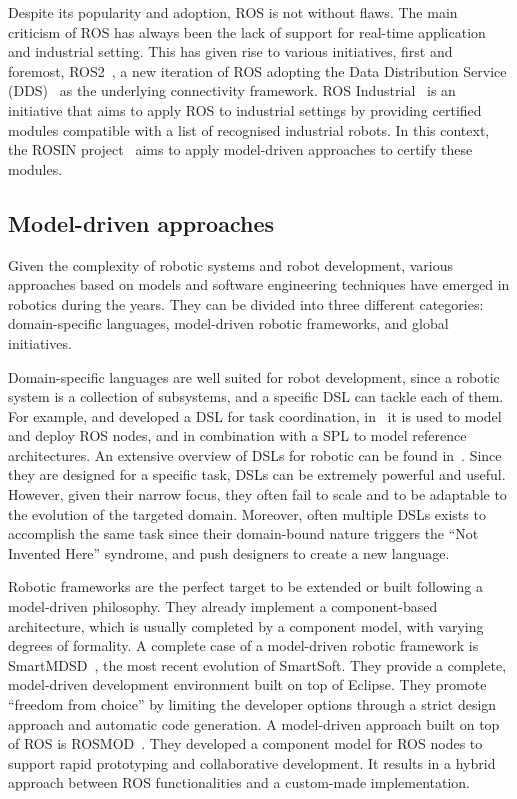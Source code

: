 Despite its popularity and adoption, ROS is not without flaws. The main criticism of ROS has always been the lack of support for real-time application and industrial setting. This has given rise to various initiatives, first and foremost, ROS2~\cite{ros2}, a new iteration of ROS adopting the Data Distribution Service (DDS)~\cite{pardo2003omg} as the underlying connectivity framework. ROS Industrial~\cite{edwards2012ros} is an initiative that aims to apply ROS to industrial settings by providing certified modules compatible with a list of recognised industrial robots. In this context, the ROSIN project~\cite{rosin} aims to apply model-driven approaches to certify these modules.

\subsection{Model-driven approaches}
Given the complexity of robotic systems and robot development, various approaches based on models and software engineering techniques have emerged in robotics during the years. They can be divided into three different categories: domain-specific languages, model-driven robotic frameworks, and global initiatives.

Domain-specific languages are well suited for robot development, since a robotic system is a collection of subsystems, and a specific DSL can tackle each of them. For example, \cite{steck2011managing} and \cite{klotzbucher2012coordinating} developed a DSL for task coordination, in~\cite{hochgeschwender2013model} it is used to model and deploy ROS nodes, and \cite{gherardi2011eclipse} in combination with a SPL to model reference architectures. An extensive overview of DSLs for robotic can be found in~\cite{nordmann2014survey}. Since they are designed for a specific task, DSLs can be extremely powerful and useful. However, given their narrow focus, they often fail to scale and to be adaptable to the evolution of the targeted domain. Moreover, often multiple DSLs exists to accomplish the same task since their domain-bound nature triggers the ``Not Invented Here'' syndrome, and push designers to create a new language.

Robotic frameworks are the perfect target to be extended or built following a model-driven philosophy. They already implement a component-based architecture, which is usually completed by a component model, with varying degrees of formality. A complete case of a model-driven robotic framework is SmartMDSD~\cite{dennis2016smartmdsd}, the most recent evolution of SmartSoft. They provide a complete, model-driven development environment built on top of Eclipse. They promote ``freedom from choice'' by limiting the developer options through a strict design approach and automatic code generation. A model-driven approach built on top of ROS is ROSMOD~\cite{kumar2016rosmod}. They developed a component model for ROS nodes to support rapid prototyping and collaborative development. It results in a hybrid approach between ROS functionalities and a custom-made implementation.

